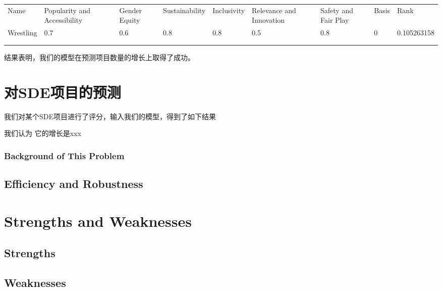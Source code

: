\documentclass[a4paper]{article}
\begin{document}
\begin{table}[]
    \begin{tabular}{lllllllll}
    Name      & Popularity and Accessibility & Gender Equity & Sustainability & Inclusivity & Relevance and Innovation & Safety and Fair Play & Basis & Rank        \\
    Wrestling & 0.7                          & 0.6           & 0.8            & 0.8         & 0.5                      & 0.8                  & 0     & 0.105263158 \\
              &                              &               &                &             &                          &                      &       &             \\
              &                              &               &                &             &                          &                      &       &            
    \end{tabular}
    \end{table}

结果表明，我们的模型在预测项目数量的增长上取得了成功。



\section{对SDE项目的预测}
我们对某个SDE项目进行了评分，输入我们的模型，得到了如下结果

我们认为 它的增长是xxx
\subsubsection{Background of This Problem}
\subsection{Efficiency and Robustness}
\section{Strengths and Weaknesses}
\subsection{Strengths}
\subsection{Weaknesses}
\end{document}
